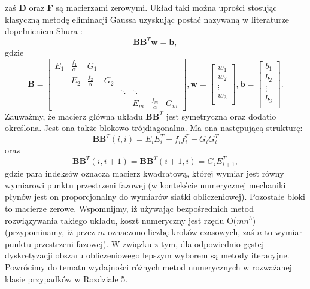 \documentclass[12pt, twoside]{book}
\begin{document}
zaś \textbf{D} oraz \textbf{F} są macierzami zerowymi.\newline
Układ taki można uprości stosując klasyczną metodę eliminacji Gaussa uzyskując postać nazywaną w literaturze dopełnieniem Shura \cite{Qiqi2}:
\begin{equation}
\textbf{B}\textbf{B}^{T}\textbf{w} = \textbf{b},
\label{LSS_v13}
\end{equation}
gdzie
\begin{equation}
\textbf{B} = \begin{bmatrix}
E_{1} & \frac{f_{1}}{\alpha} & G_{1} &  &  &  &  &  \\
& E_{2} & \frac{f_{2}}{\alpha} & G_{2} &  &  &  &  \\
&  &  &  & \ddots & \ddots &  &  \\
&  &  &  &  & E_{m} & \frac{f_{m}}{\alpha} & G_{m} 
\end{bmatrix},
\textbf{w} = \begin{bmatrix}
w_{1} \\
w_{2} \\
\vdots \\
w_{3}\\
\end{bmatrix},
\textbf{b} = \begin{bmatrix}
b_{1} \\
b_{2} \\
\vdots \\
b_{3}\\
\end{bmatrix}.	
\label{LSS_v14}
\end{equation}
Zauważmy, że macierz główna układu $ \textbf{B}\textbf{B}^{T} $ jest symetryczna oraz dodatio określona. Jest ona także blokowo-trójdiagonalna. Ma ona następującą strukturę:
\begin{equation}
\textbf{B}\textbf{B}^{T}(i,i) = E_{i}E_{i}^{T}+f_{i}f_{i}^{T}+G_{i}G_{i}^{T} 
\label{LSS_v16}
\end{equation}
oraz
\begin{equation}
\textbf{B}\textbf{B}^{T}(i,i+1) = \textbf{B}\textbf{B}^{T}(i+1,i) = G_{i}E_{i+1}^{T},
\label{LSS_v17}
\end{equation}
gdzie para indeksów oznacza macierz kwadratową, której wymiar jest równy wymiarowi punktu przestrzeni fazowej (w kontekście numerycznej mechaniki płynów jest on proporcjonalny do wymiarów siatki obliczeniowej). Pozostałe bloki to macierze zerowe. Wspomnijmy, iż używając bezpośrednich metod rozwiązywania takiego układu, koszt numeryczny jest rzędu O($ mn^{3} $) (przypominamy, iż przez $ m $ oznaczono liczbę kroków czasowych, zaś $ n $ to wymiar punktu przestrzeni fazowej). W związku z tym, dla odpowiednio gęstej dyskretyzacji obszaru obliczeniowego lepszym wyborem są metody iteracyjne. Powrócimy do tematu wydajności różnych metod numerycznych w rozważanej klasie przypadków w Rozdziale 5. \newline
\end{document}
